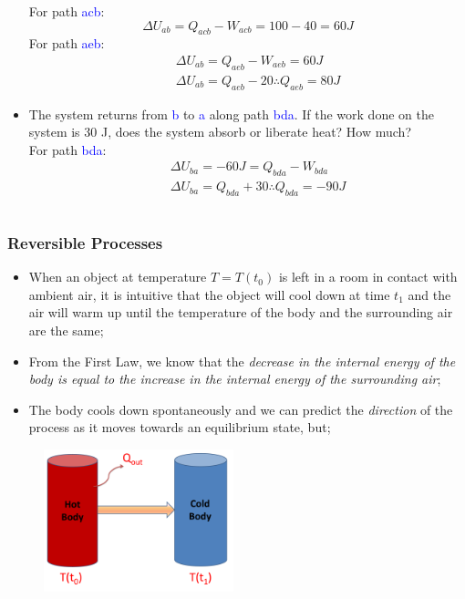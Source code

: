 \documentclass[10pt,compress]{beamer}
\begin{document}
\begin{frame}
\begin{columns}
\begin{column}[r]{0.5\linewidth}
\begin{itemize}
          For path \textcolor{blue}{acb}:
          \begin{displaymath}
           \Delta U_{ab} = Q_{acb}-W_{acb} = 100 - 40 = 60 J
          \end{displaymath}
          For path \textcolor{blue}{aeb}:
          \begin{eqnarray}
           &&\Delta U_{ab} = Q_{aeb}-W_{aeb} = 60 J \nonumber \\
           &&\Delta U_{ab} = Q_{aeb}-20 \therefore Q_{aeb} = 80 J \nonumber
          \end{eqnarray}
    \item<3-> The system returns from \textcolor{blue}{b} to \textcolor{blue}{a} along path \textcolor{blue}{bda}. If the work done on the system is 30 J, does the system absorb or liberate heat? How much? \\
           For path \textcolor{blue}{bda}: 
           \begin{eqnarray}
            &&\Delta U_{ba} = -60 J = Q_{bda}-W_{bda} \nonumber \\
            &&\Delta U_{ba} = Q_{bda} + 30 \therefore Q_{bda} = -90 J \nonumber
           \end{eqnarray}
   \end{itemize}
  \end{column}
 \end{columns}
\normalsize
\end{frame}


\begin{frame}
 \frametitle{Reversible Processes}
   \begin{itemize}
    \item When an object at temperature $T=T\left(t_{0}\right)$ is left in a room in contact with ambient air, it is intuitive that the object will cool down at time $t_{1}$ and the air will warm up until the temperature of the body and the surrounding air are the same;
    \item From the First Law, we know that the {\it decrease in the internal energy of the body is equal to the increase in the internal energy of the surrounding air};
    \item The body cools down spontaneously and we can predict the {\it direction} of the process as it moves towards an equilibrium state, but; 
   \end{itemize}
    \begin{figure}%
     \begin{center}
      \includegraphics[width=5.5cm,clip]{./Pics/HotColdCoffee}
     \end{center}
    \end{figure}
 \normalsize
\end{frame}
\end{document}
